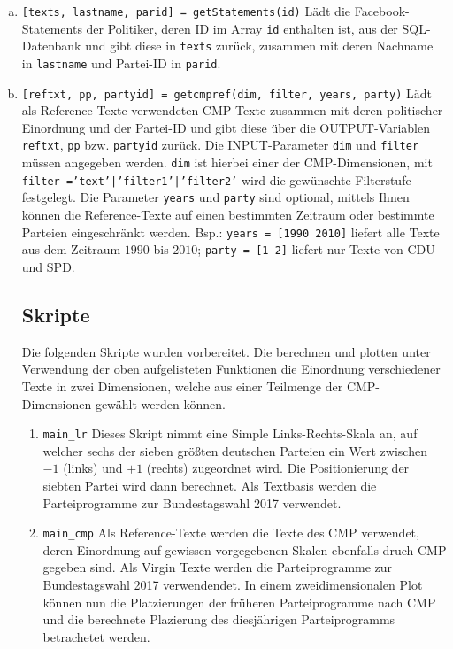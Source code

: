 \begin{enumerate}[(a)]
\item \label{getStatements} \texttt{[texts, lastname, parid] = getStatements(id)} \newline
    Lädt die Facebook-Statements der Politiker, deren ID im Array \texttt{id} enthalten ist, aus der SQL-Datenbank und gibt diese in \texttt{texts} zurück, zusammen mit deren Nachname in \texttt{lastname} und Partei-ID in \texttt{parid}.

\item \label{getcmpref} \texttt{[reftxt, pp, partyid] = getcmpref(dim, filter, years, party)} \newline
    Lädt als Reference-Texte verwendeten CMP-Texte zusammen mit deren politischer Einordnung und der Partei-ID und gibt diese über die OUTPUT-Variablen \texttt{reftxt}, \texttt{pp} bzw. \texttt{partyid} zurück. Die INPUT-Parameter \texttt{dim} und \texttt{filter} müssen angegeben werden. \texttt{dim} ist hierbei einer der CMP-Dimensionen, mit \texttt{filter =}\linebreak\texttt{'text'|'filter1'|'filter2'} wird die gewünschte Filterstufe festgelegt. Die Parameter \texttt{years} und \texttt{party} sind optional, mittels Ihnen können die Reference-Texte auf einen bestimmten Zeitraum oder bestimmte Parteien eingeschränkt werden. Bsp.: \texttt{years = [1990 2010]} liefert alle Texte aus dem Zeitraum $1990$ bis $2010$; \texttt{party = [1 2]} liefert nur Texte von CDU und SPD.

\subsection{Skripte}
Die folgenden Skripte wurden vorbereitet. Die berechnen und plotten unter Verwendung der oben aufgelisteten Funktionen die Einordnung verschiedener Texte in zwei Dimensionen, welche aus einer Teilmenge der CMP-Dimensionen gewählt werden können.

\begin{enumerate}
\item \verb|main_lr| \newline
Dieses Skript nimmt eine Simple Links-Rechts-Skala an, auf welcher sechs der sieben größten deutschen Parteien ein Wert zwischen $-1$ (links) und $+1$ (rechts) zugeordnet wird. Die Positionierung der siebten Partei wird dann berechnet. Als Textbasis werden die Parteiprogramme zur Bundestagswahl 2017 verwendet.

\item \verb|main_cmp| \newline
Als Reference-Texte werden die Texte des CMP verwendet, deren Einordnung auf gewissen vorgegebenen Skalen ebenfalls druch CMP gegeben sind. Als Virgin Texte werden die Parteiprogramme zur Bundestagswahl 2017 verwendendet. In einem zweidimensionalen Plot können nun die Platzierungen der früheren Parteiprogramme nach CMP und die berechnete Plazierung des diesjährigen Parteiprogramms betrachetet werden.


\end{enumerate}
\end{enumerate}
